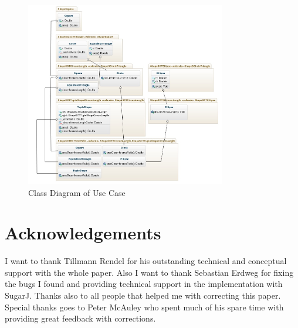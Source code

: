 \documentclass{report}
\begin{document}
\begin{figure}[h]
\includegraphics[width=330px,keepaspectratio=true]{Expression_problem-diag2.jpg}
\caption{Class Diagram of Use Case}
\end{figure}

\listoffigures

\chapter*{Acknowledgements}
I want to thank Tillmann Rendel for his outstanding technical and conceptual support with the whole paper. Also I want to thank Sebastian Erdweg for fixing the bugs I found and providing technical support in the implementation with SugarJ. Thanks also to all people that helped me with correcting this paper. Special thanks goes to Peter McAuley who spent much of his spare time with providing great feedback with corrections.

\begingroup
\renewcommand{\cleardoublepage}{}
\renewcommand{\clearpage}{}




\endgroup
\end{document}
